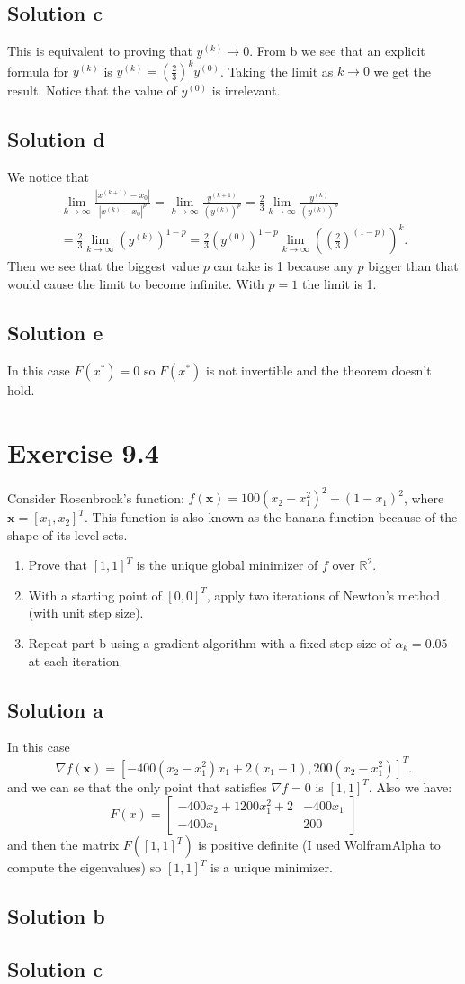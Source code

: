 \documentclass{article}
\newcommand{\bld}[1]{\boldsymbol{#1}}
\begin{document}
\subsection*{Solution c}
This is equivalent to proving that $y^{(k)}\to 0$. From b we see that an
explicit formula for $y^{(k)}$ is $y^{(k)}=\left(\frac{2}{3}\right)^ky^{(0)}$.
Taking the limit as $k\to 0$ we get the result. Notice that the value of
$y^{(0)}$ is irrelevant.
\subsection*{Solution d}
We notice that
\begin{multline*}
	\lim_{k\to \infty} \frac{|x^{(k+1)}-x_0|}{|x^{(k)}-x_0|^p} = \lim_{k\to
	\infty}\frac{y^{(k+1)}}{\left(y^{(k)}\right)^p}=
\frac{2}{3}\lim_{k\to\infty}\frac{y^{(k)}}{(y^{(k)})^p}\\
= \frac{2}{3}\lim_{k\to\infty}(y^{(k)})^{1-p} =
\frac{2}{3}(y^{(0)})^{1-p}\lim_{k\to\infty}\left(\left(\frac{2}{3}\right)^{(1-p)}\right)^k.
\end{multline*}
Then we see that the biggest value $p$ can take is 1 because any $p$ bigger
than that would cause the limit to become infinite. With $p=1$ the limit is 1.
\subsection*{Solution e}
In this case $F(x^*)=0$ so $F(x^*)$ is not invertible and the theorem doesn't
hold.
\section*{Exercise 9.4}
Consider Rosenbrock's function: $f(\bld{x})=100(x_2-x_1^2)^2+(1-x_1)^2$, where
$\bld{x}=[x_1,x_2]^T$. This function is also known as the banana function
because of the shape of its level sets.
\begin{enumerate}[label=\alph*.]
\item Prove that $[1,1]^T$ is the unique global minimizer of $f$ over
	$\mathbb{R}^2$.
\item With a starting point of $[0,0]^T$, apply two iterations of Newton's
	method (with unit step size).
\item Repeat part b using a gradient algorithm with a fixed step size of
	$\alpha_k=0.05$ at each iteration.
\end{enumerate}
\subsection*{Solution a}
In this case
\[
	\nabla f(\bld{x})=[-400(x_2-x_1^2)x_1+2(x_1-1),200(x_2-x_1^2)]^T.
\]
and we can se that the only point that satisfies $\nabla f=0$ is $[1,1]^T$.
Also we have:
\[
	F(x)=\begin{bmatrix}
		-400x_2 + 1200x_1^2 + 2 & -400x_1 \\
		-400x_1 & 200
	\end{bmatrix}
\]
and then the matrix $F([1,1]^T)$ is positive definite (I used WolframAlpha to
compute the eigenvalues) so $[1,1]^T$ is a unique minimizer.
\subsection*{Solution b}
\subsection*{Solution c}
\end{document}
